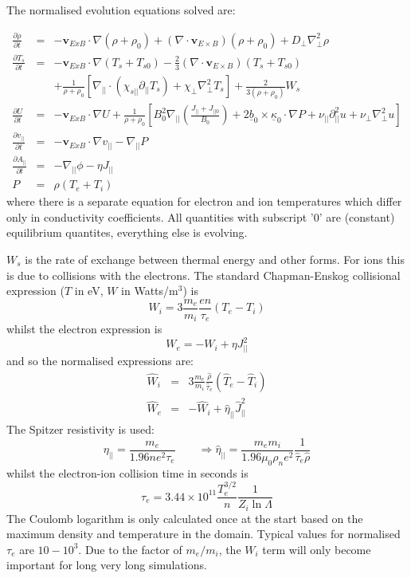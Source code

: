 \documentclass[12pt]{article}
\newcommand{\deriv}[2]{\ensuremath{\frac{\partial #1}{\partial #2}}}
\newcommand{\Vec}[1]{\ensuremath{\mathbf{#1}}}
\newcommand{\bvec}{\ensuremath{\underline{b}}}
\newcommand{\kvec}{\ensuremath{\underline{\kappa}}}
\newcommand{\apar}{\ensuremath{A_{||}}}
\begin{document}
The normalised evolution equations solved are:

\begin{eqnarray*}
  \deriv{\rho}{t} &=& -\Vec{v}_{ExB}\cdot\nabla\left(\rho + \rho_0\right) + \left(\nabla\cdot\Vec{v}_{E\times B}\right)\left(\rho + \rho_0\right) + D_\perp\nabla_\perp^2\rho \\
  \deriv{T_s}{t} &=& -\Vec{v}_{ExB}\cdot\nabla\left(T_s + T_{s0}\right) - \frac{2}{3}\left(\nabla\cdot\Vec{v}_{E\times B}\right)\left(T_s + T_{s0}\right) \\
  &&+ \frac{1}{\rho + \rho_0}\left[ \nabla_{||}\cdot\left(\chi_{s||}\partial_{||}T_s\right) + \chi_\perp\nabla_\perp^2T_s\right] + \frac{2}{3\left(\rho+\rho_0\right)}W_s \\
  \deriv{U}{t} &=& -\Vec{v}_{ExB}\cdot\nabla U + \frac{1}{\rho+\rho_0}\left[ B_0^2\nabla_{||}\left(\frac{J_{||}+J_{||0}}{B_0}\right) + 2\bvec_0\times\kvec_0\cdot\nabla P + \nu_{||}\partial_{||}^2u + \nu_\perp\nabla_\perp^2u\right] \\
\deriv{v_{||}}{t} &=& -\Vec{v}_{ExB}\cdot\nabla v_{||} - \nabla_{||} P \\
\deriv{\apar}{t} &=& -\nabla_{||}\phi - \eta J_{||} \\
P &=& \rho\left(T_e + T_i\right)
\end{eqnarray*}
where there is a separate equation for electron and ion temperatures which
differ only in conductivity coefficients. All quantities with subscript '0'
are (constant) equilibrium quantites, everything else is evolving.

$W_s$ is the rate of exchange between thermal energy and other forms. For
ions this is due to collisions with the electrons. The standard Chapman-Enskog
collisional expression ($T$ in eV, $W$ in Watts/m$^3$) is
\[
W_i = 3\frac{m_e}{m_i}\frac{en}{\tau_e}\left(T_e - T_i\right)
\]
whilst the electron expression is
\[
W_e = -W_i + \eta J_{||}^2
\]
and so the normalised expressions are:
\begin{eqnarray*}
  \hat{W}_i &=& 3\frac{m_e}{m_i} \frac{\hat{\rho}}{\hat{\tau}_e}\left(\hat{T}_e - \hat{T}_i\right) \\
  \hat{W}_e &=& -\hat{W}_i + \hat{\eta}_{||}\hat{J}_{||}^2
\end{eqnarray*}
The Spitzer resistivity is used:
\[
\eta_{||} = \frac{m_e}{1.96ne^2\tau_e} \qquad \Rightarrow \hat{\eta}_{||} = \frac{m_em_i}{1.96\mu_0\rho_ne^2}\frac{1}{\hat{\tau}_e\hat{\rho}}
\]
whilst the electron-ion collision time in seconds is
\[
\tau_e = 3.44\times 10^{11}\frac{T_e^{3/2}}{n}\frac{1}{Z_i\ln\Lambda}
\]
The Coulomb logarithm is only calculated once at the start based on the maximum density and temperature in the domain. Typical values for normalised $\tau_e$ are $10 - 10^3$. Due to the factor of $m_e/m_i$, the $W_i$ term will only become important for long very long simulations. 
\end{document}
